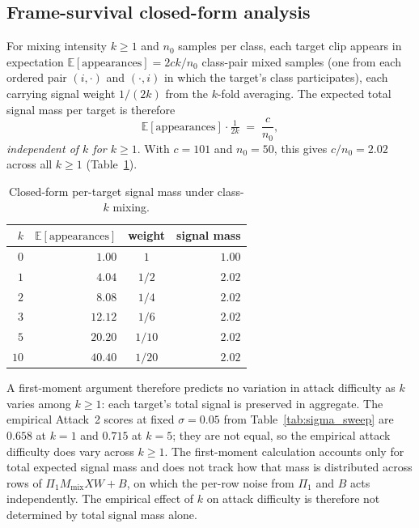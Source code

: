 \documentclass[sigconf,anonymous, review]{acmart}
\begin{document}
\subsection{Frame-survival closed-form analysis}
\label{app:frame_survival}

For mixing intensity $k \ge 1$ and $n_0$ samples per class, each target clip appears in expectation $\mathbb{E}[\text{appearances}] = 2ck/n_0$ class-pair mixed samples (one from each ordered pair $(i, \cdot)$ and $(\cdot, i)$ in which the target's class participates), each carrying signal weight $1/(2k)$ from the $k$-fold averaging. The expected total signal mass per target is therefore
\[
\mathbb{E}[\text{appearances}] \cdot \tfrac{1}{2k} \;=\; \frac{c}{n_0},
\]
\emph{independent of $k$ for $k \ge 1$}. With $c = 101$ and $n_0 = 50$, this gives $c/n_0 = 2.02$ across all $k \ge 1$ (Table~\ref{tab:frame_survival}).

\begin{table}[!htbp]
\centering\small
\caption{Closed-form per-target signal mass under class-$k$ mixing.}
\label{tab:frame_survival}
\begin{tabular}{rrcr}
\toprule
$k$ & $\mathbb{E}[\text{appearances}]$ & weight & signal mass \\
\midrule
$0$  & $1.00$  & $1$    & $1.00$ \\
$1$  & $4.04$  & $1/2$  & $2.02$ \\
$2$  & $8.08$  & $1/4$  & $2.02$ \\
$3$  & $12.12$ & $1/6$  & $2.02$ \\
$5$  & $20.20$ & $1/10$ & $2.02$ \\
$10$ & $40.40$ & $1/20$ & $2.02$ \\
\bottomrule
\end{tabular}
\end{table}

A first-moment argument therefore predicts no variation in attack difficulty as $k$ varies among $k \ge 1$: each target's total signal is preserved in aggregate. The empirical Attack~2 scores at fixed $\sigma = 0.05$ from Table~\ref{tab:sigma_sweep} are $0.658$ at $k = 1$ and $0.715$ at $k = 5$; they are not equal, so the empirical attack difficulty does vary across $k \ge 1$. The first-moment calculation accounts only for total expected signal mass and does not track how that mass is distributed across rows of $\Pi_1 M_{\mathrm{mix}} X W + B$, on which the per-row noise from $\Pi_1$ and $B$ acts independently. The empirical effect of $k$ on attack difficulty is therefore not determined by total signal mass alone.
\end{document}
